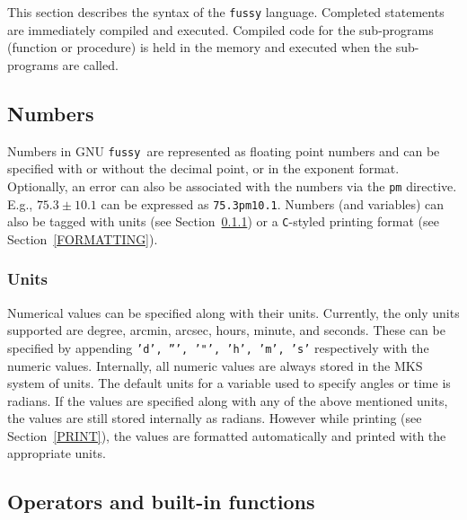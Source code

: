\documentclass[11pt]{article}
\newcommand{\Fussy}{GNU {\tt fussy}}
\begin{document}
This section describes the syntax of the {\tt fussy} language.  Completed statements are
immediately compiled and executed.  Compiled code for the sub-programs (function or
procedure) is held in the memory and executed when the sub-programs are called.

\subsection{Numbers}
\label{NUMBERS}
Numbers in \Fussy\ are represented as floating point numbers and can
be specified with or without the decimal point, or in the exponent
format.  Optionally, an error can also be associated with the numbers
via the {\tt pm} directive.  E.g., $75.3\pm 10.1$ can be expressed as
{\tt 75.3pm10.1}.  Numbers (and variables) can also be tagged with units (see
Section~\ref{UNITS}) or a {\tt C}-styled printing format (see
Section~\ref{FORMATTING}).

\subsubsection{Units}
\label{UNITS}
   
Numerical values can be specified along with their units.  Currently, the only units
supported are degree, arcmin, arcsec, hours, minute, and seconds.  These can be specified
by appending {\tt 'd', ''', '"', 'h', 'm', 's'} respectively with the numeric values.
Internally, all numeric values are always stored in the MKS system of units.  The default
units for a variable used to specify angles or time is radians.  If the values are
specified along with any of the above mentioned units, the values are still stored
internally as radians.  However while printing (see Section~\ref{PRINT}), the values are
formatted automatically and printed with the appropriate units.

\subsection{Operators and built-in functions}
\end{document}
